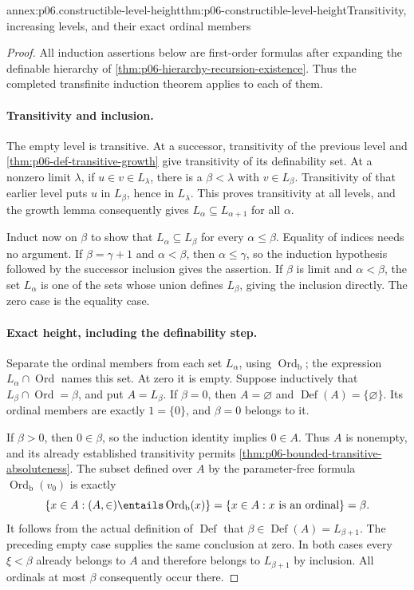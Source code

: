 \begin{annexitem}{annex:p06.constructible-level-height}{thm:p06-constructible-level-height}{Transitivity, increasing levels, and their exact ordinal members}
\begin{proof}
All induction assertions below are first-order formulas after
expanding the definable hierarchy of
\cref{thm:p06-hierarchy-recursion-existence}.  Thus the completed
transfinite induction theorem applies to each of them.

\paragraph{Transitivity and inclusion.}
The empty level is transitive.  At a successor, transitivity of
the previous level and \cref{thm:p06-def-transitive-growth}
give transitivity of its definability set.  At a nonzero limit
\(\lambda\), if \(u\in v\in L_\lambda\), there is a
\(\beta<\lambda\) with \(v\in L_\beta\).  Transitivity of
that earlier level puts \(u\) in \(L_\beta\), hence in
\(L_\lambda\).  This proves transitivity at all levels, and
the growth lemma consequently gives
\(L_\alpha\subseteq L_{\alpha+1}\) for all \(\alpha\).

Induct now on \(\beta\) to show that
\(L_\alpha\subseteq L_\beta\) for every \(\alpha\leq\beta\).
Equality of indices needs no argument.  If \(\beta=\gamma+1\)
and \(\alpha<\beta\), then \(\alpha\leq\gamma\), so the
induction hypothesis followed by the successor inclusion gives
the assertion.  If \(\beta\) is limit and \(\alpha<\beta\),
the set \(L_\alpha\) is one of the sets whose union defines
\(L_\beta\), giving the inclusion directly.  The zero case is
the equality case.

\paragraph{Exact height, including the definability step.}
Separate the ordinal members from each set \(L_\alpha\), using
\(\operatorname{Ord}_{\mathrm b}\); the expression
\(L_\alpha\cap\operatorname{Ord}\) names this set.  At zero it
is empty.  Suppose inductively that
\(L_\beta\cap\operatorname{Ord}=\beta\), and put \(A=L_\beta\).
If \(\beta=0\), then \(A=\varnothing\) and
\(\operatorname{Def}(A)=\{\varnothing\}\).  Its ordinal members
are exactly \(1=\{0\}\), and \(\beta=0\) belongs to it.

If \(\beta>0\), then \(0\in\beta\), so the induction
identity implies \(0\in A\).  Thus \(A\) is nonempty, and
its already established transitivity permits
\cref{thm:p06-bounded-transitive-absoluteness}.  The subset
defined over \(A\) by the parameter-free formula
\(\operatorname{Ord}_{\mathrm b}(v_0)\) is exactly
\[
 \{x\in A:(A,\in)\entails\operatorname{Ord}_{\mathrm b}(x)\}
   =\{x\in A:x\text{ is an ordinal}\}=\beta.
\]
It follows from the actual definition of \(\operatorname{Def}\)
that \(\beta\in\operatorname{Def}(A)=L_{\beta+1}\).
The preceding empty case supplies the same conclusion at zero.
In both cases every \(\xi<\beta\) already belongs to \(A\)
and therefore belongs to \(L_{\beta+1}\) by inclusion.
All ordinals at most \(\beta\) consequently occur there.


\end{proof}
\end{annexitem}
